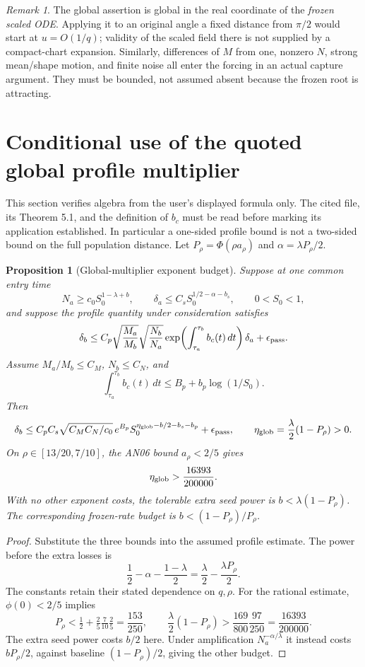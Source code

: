 \documentclass[11pt]{article}
\numberwithin{equation}{section}
\newtheorem{proposition}[theorem]{Proposition}
\theoremstyle{remark}\newtheorem{remark}[theorem]{Remark}
\newcommand{\dd}{\,d}
\newcommand{\1}{\mathbf1}
\begin{document}
\begin{remark}
The global assertion is global in the real coordinate of the \emph{frozen
scaled ODE}. Applying it to an original angle a fixed distance from $\pi/2$
would start at $u=O(1/q)$; validity of the scaled field there is not supplied
by a compact-chart expansion. Similarly, differences of $M$ from one,
nonzero $N$, strong mean/shape motion, and finite noise all enter the
forcing in an actual capture argument. They must be bounded, not assumed
absent because the frozen root is attracting.
\end{remark}

\section{Conditional use of the quoted global profile multiplier}
This section verifies algebra from the user's displayed formula only.
The cited file, its Theorem 5.1, and the definition of $b_c$ must be read
before marking its application established. In particular a one-sided
profile bound is not a two-sided bound on the full population distance.
Let $P_\rho=\Phi(\rho a_\rho)$ and $\alpha=\lambda P_\rho/2$.

\begin{proposition}[Global-multiplier exponent budget]
\label{inc:SGWR:v1:globalexponent}
Suppose at one common entry time
\[
 N_a\ge c_0S_0^{1-\lambda+b},\qquad
 \delta_a\le C_sS_0^{1/2-\alpha-b_s},\qquad 0<S_0<1,
\]
and suppose the profile quantity under consideration satisfies
\[
 \delta_b\le C_p
 \sqrt{\frac{M_a}{M_b}}\sqrt{\frac{N_b}{N_a}}
 \exp\!\left(\int_{\tau_a}^{\tau_b}b_c(t)\dd t\right)\delta_a
 +\epsilon_{\rm pass}.
\]
Assume $M_a/M_b\le C_M$, $N_b\le C_N$, and
\[
 \int_{\tau_a}^{\tau_b}b_c(t)\dd t\le B_p+b_p\log(1/S_0).
\]
Then
\begin{equation}\label{inc:SGWR:v1:globalpower}
 \delta_b\le C_pC_s\sqrt{C_MC_N/c_0}\,e^{B_p}
 S_0^{\eta_{\rm glob}-b/2-b_s-b_p}+\epsilon_{\rm pass},
 \qquad
 \eta_{\rm glob}=\frac\lambda2(1-P_\rho)>0.
\end{equation}
On $\rho\in[13/20,7/10]$, the AN06 bound $a_\rho<2/5$ gives
\begin{equation}\label{inc:SGWR:v1:rationalmargin}
 \eta_{\rm glob}>\frac{16393}{200000}.
\end{equation}
With no other exponent costs, the tolerable extra seed power is
$b<\lambda(1-P_\rho)$. The corresponding frozen-rate budget is
$b<(1-P_\rho)/P_\rho$.
\end{proposition}
\begin{proof}
Substitute the three bounds into the assumed profile estimate. The power
before the extra losses is
\[
 \frac12-\alpha-\frac{1-\lambda}{2}
 =\frac\lambda2-\frac{\lambda P_\rho}{2}.
\]
The constants retain their stated dependence on $q,\rho$.
For the rational estimate, $\phi(0)<2/5$ implies
\[
 P_\rho<\tfrac12+\tfrac25\tfrac7{10}\tfrac25=\frac{153}{250},
 \qquad
 \frac\lambda2(1-P_\rho)>
 \frac{169}{800}\frac{97}{250}=\frac{16393}{200000}.
\]
The extra seed power costs $b/2$ here. Under amplification
$N_a^{-\alpha/\lambda}$ it instead costs $bP_\rho/2$, against baseline
$(1-P_\rho)/2$, giving the other budget.
\end{proof}
\end{document}
